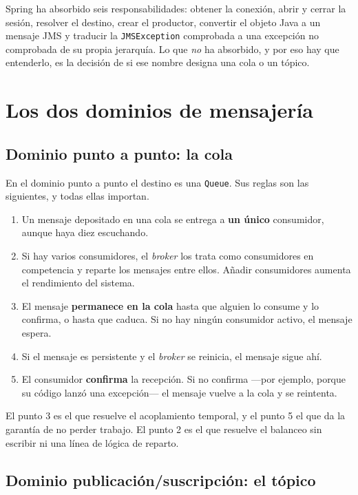 \documentclass[11pt,a4paper]{book}
\newcommand{\clase}[1]{\texttt{#1}}
\begin{document}
Spring ha absorbido seis responsabilidades: obtener la conexión, abrir y cerrar la sesión, resolver el destino, crear el productor, convertir el objeto Java a un mensaje JMS y traducir la \clase{JMSException} comprobada a una excepción no comprobada de su propia jerarquía.
Lo que \emph{no} ha absorbido, y por eso hay que entenderlo, es la decisión de si ese nombre designa una cola o un tópico.

\chapter{Los dos dominios de mensajería}
\label{cap:dominios}

\section{Dominio punto a punto: la cola}

En el dominio punto a punto el destino es una \clase{Queue}.
Sus reglas son las siguientes, y todas ellas importan.

\begin{enumerate}[leftmargin=1.8em,itemsep=3pt,topsep=3pt]
	\item Un mensaje depositado en una cola se entrega a \textbf{un único} consumidor, aunque haya diez escuchando.
	\item Si hay varios consumidores, el \emph{broker} los trata como consumidores en competencia y reparte los mensajes entre ellos. Añadir consumidores aumenta el rendimiento del sistema.
	\item El mensaje \textbf{permanece en la cola} hasta que alguien lo consume y lo confirma, o hasta que caduca. Si no hay ningún consumidor activo, el mensaje espera.
	\item Si el mensaje es persistente y el \emph{broker} se reinicia, el mensaje sigue ahí.
	\item El consumidor \textbf{confirma} la recepción. Si no confirma ---por ejemplo, porque su código lanzó una excepción--- el mensaje vuelve a la cola y se reintenta.
\end{enumerate}

El punto 3 es el que resuelve el acoplamiento temporal, y el punto 5 el que da la garantía de no perder trabajo.
El punto 2 es el que resuelve el balanceo sin escribir ni una línea de lógica de reparto.

\section{Dominio publicación/suscripción: el tópico}
\end{document}
